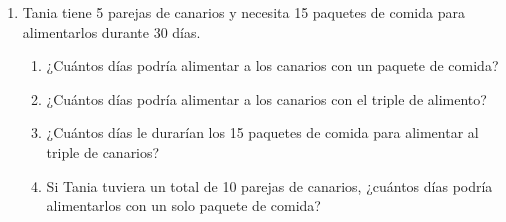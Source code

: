 \documentclass[11pt]{book}
\begin{document}
\begin{enumerate}
  \item Tania tiene 5 parejas de canarios y necesita 15 paquetes de comida para alimentarlos durante 30 días.
        \begin{enumerate}
          \item ¿Cuántos días podría alimentar a los canarios con un paquete de comida?\\
          \item ¿Cuántos días podría alimentar a los canarios con el triple de alimento?\\
          \item ¿Cuántos días le durarían los 15 paquetes de comida para alimentar al triple de canarios?\\
          \item Si Tania tuviera un total de 10 parejas de canarios, ¿cuántos días podría alimentarlos con un
                solo paquete de comida?\\
\end{enumerate}
\end{enumerate}
\end{document}
